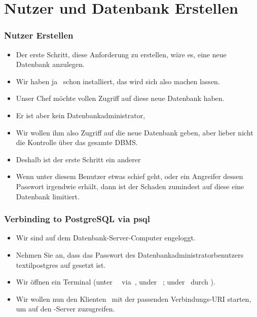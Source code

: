 \documentclass[aspectratio=169,mathserif,notheorems]{beamer}%
\begin{document}
\section{Nutzer und Datenbank Erstellen}%
%
\begin{frame}%
\frametitle{Nutzer Erstellen}%
\begin{itemize}%
\item Der erste Schritt, diese Anforderung zu erstellen, wäre es, eine neue Datenbank anzulegen.%
\item<2-> Wir haben ja \postgresql\ schon installiert, das wird sich also machen lassen.%
\item<3-> Unser Chef möchte vollen Zugriff auf diese neue Datenbank haben.%
\item<4-> Er ist aber kein Datenbankadministrator,
\item<5-> Wir wollen ihm also Zugriff auf die neue Datenbank geben, aber lieber nicht die Kontrolle über das gesamte DBMS.%
\item<6-> Deshalb ist der erste Schritt ein anderer
\item<8-> Wenn unter diesem Benutzer etwas schief geht, oder ein Angreifer dessen Passwort irgendwie erhält, dann ist der Schaden zumindest auf diese eine Datenbank limitiert.%
\end{itemize}%
\end{frame}%
%
\begin{frame}%
\frametitle{Verbinding to PostgreSQL via psql}%
\begin{itemize}%
\item Wir sind auf dem Datenbank-Server-Computer engeloggt.%
\item<2-> Nehmen Sie an, dass das Passwort des Datenbankadministratorbenutzers \\textil{postgres} auf  gesetzt ist.%
\item<4-> Wir öffnen ein Terminal (unter \ubuntu\ \linux\ via~\ubuntuTerminal, under \ubuntu\ \linux; under \microsoftWindows\ durch \windowsTerminal).%
\item<5-> Wir wollen nun den Klienten \psql\ mit der passenden Verbindungs-URI\cite{PGDG:PD} starten, um auf den \postgresql-Server zuzugreifen.%
\end{itemize}%
%
\end{frame}%
\end{document}
